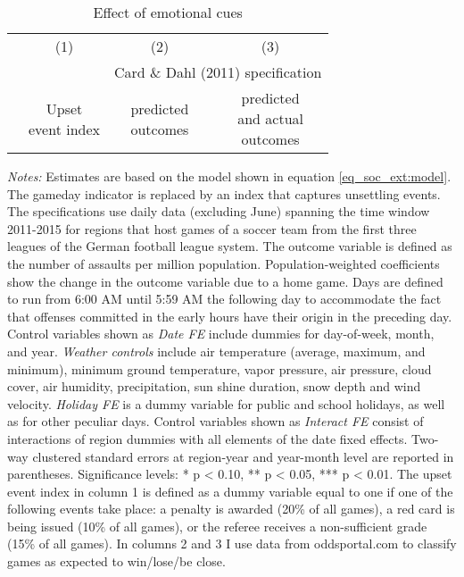 \begin{table}[H] \centering 
	\begin{threeparttable} \centering \caption{Effect of emotional cues}\label{tab_soc_ext:reg_fe_assrate_emotional_cues}
		{\def\sym#1{\ifmmode^{#1}\else\(^{#1}\)\fi} 
			\begin{tabular}{l*{3}{c}}
				\toprule 
				&\multicolumn{1}{c}{(1)}&\multicolumn{1}{c}{(2)}&\multicolumn{1}{c}{(3)}\\
				&&\multicolumn{2}{c}{Card \& Dahl (2011) specification}\\
				\cmidrule(lr){3-4}
				&\clb{c}{Upset\\event index} & \clb{c}{predicted\\outcomes}& \clb{c}{predicted\\and actual\\outcomes}\\
				\midrule
				 
				\bottomrule 
		\end{tabular}}
		\begin{tablenotes} 
			\item \scriptsize \emph{Notes:} Estimates are based on the model shown in equation \ref{eq_soc_ext:model}. The gameday indicator is replaced by an index that captures unsettling events. The specifications use daily data (excluding June) spanning the time window 2011-2015 for regions that host games of a soccer team from the first three leagues of the German football league system. The outcome variable is defined as the number of assaults per million population. Population-weighted coefficients show the change in the outcome variable due to a home game. Days are defined to run from 6:00 AM until 5:59 AM the following day to accommodate the fact that offenses committed in the early hours have their origin in the preceding day. Control variables shown as \textit{Date FE} include dummies for day-of-week, month, and year. \textit{Weather controls} include air temperature (average, maximum, and minimum), minimum ground temperature, vapor pressure, air pressure, cloud cover, air humidity, precipitation, sun shine duration, snow depth and wind velocity. \textit{Holiday FE} is a dummy variable for public and school holidays, as well as for other peculiar days. Control variables shown as \textit{Interact FE} consist of interactions of region dummies with all elements of the date fixed effects. Two-way clustered standard errors at region-year and year-month level are reported in parentheses. \newline Significance levels: * p < 0.10, ** p < 0.05, *** p < 0.01. \newline 	The upset event index in column 1 is defined as a dummy variable equal to one if one of the following events take place: a penalty is awarded (20\% of all games), a red card is being issued (10\% of all games), or the referee receives a non-sufficient grade (15\% of all games). In columns 2 and 3 I use data from oddsportal.com to classify games as expected to win/lose/be close.
		\end{tablenotes} 
	\end{threeparttable} 
\end{table}